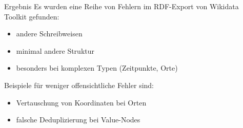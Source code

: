 \documentclass[aspectratio=1609,xcolor=usenames,dvipsnames,svgnames]{beamer}
\begin{document}
\begin{frame}
\begin{center}
  \end{center}
\end{frame}

\begin{frame}{Ergebnis}
  Es wurden eine Reihe von Fehlern im RDF-Export von Wikidata Toolkit gefunden:
  \begin{itemize}
    \item andere Schreibweisen
    \item minimal andere Struktur
    \item besonders bei komplexen Typen (Zeitpunkte, Orte)
  \end{itemize}

  Beispiele für weniger offensichtliche Fehler sind:
  \begin{itemize}
      \item Vertauschung von Koordinaten bei Orten
      \item falsche Deduplizierung bei Value-Nodes
  \end{itemize}
\end{frame}
\end{document}
